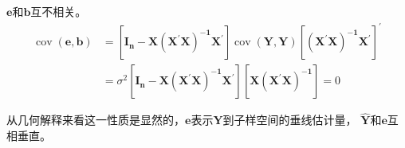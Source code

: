 \begin{mypty}
   $ \boldsymbol{e} $和$ \boldsymbol{b} $互不相关。
$$ \begin{aligned}
    \operatorname{cov}(\boldsymbol{e, b}) & = \boldsymbol{\left[I_{n}-X\left(X^{\prime} X\right)^{-1} X^{\prime}\right]} 
    \operatorname{cov}(\boldsymbol{Y, Y}) \boldsymbol{\left[\left(X^{\prime} X\right)^{-1} X^{\prime}\right]^{\prime}} \\
    & = \sigma^{2} \boldsymbol{\left[I_{n}-X\left(X^{\prime} X\right)^{-1} X^{\prime}\right]\left[X\left(X^{\prime} X\right)^{-1}\right]}=0
    \end{aligned}  $$ 
    
   从几何解释来看这一性质是显然的，$ \boldsymbol{e} $表示$ \boldsymbol{Y} $到子样空间的垂线估计量， 
   $ \boldsymbol{\hat{Y}} $和$ \boldsymbol{e} $互相垂直。
\end{mypty}

